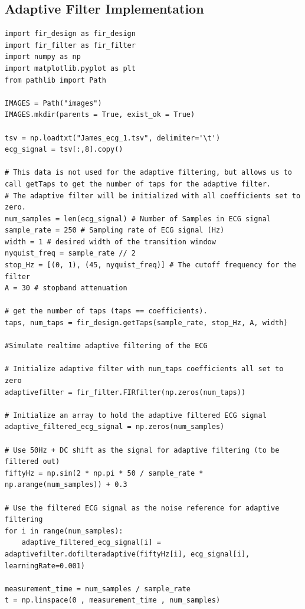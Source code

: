 \documentclass[8pt]{extarticle}
\begin{document}
\subsection{Adaptive Filter Implementation}
\begin{verbatim}
import fir_design as fir_design
import fir_filter as fir_filter
import numpy as np
import matplotlib.pyplot as plt
from pathlib import Path

IMAGES = Path("images")
IMAGES.mkdir(parents = True, exist_ok = True)

tsv = np.loadtxt("James_ecg_1.tsv", delimiter='\t')
ecg_signal = tsv[:,8].copy()

# This data is not used for the adaptive filtering, but allows us to call getTaps to get the number of taps for the adaptive filter. 
# The adaptive filter will be initialized with all coefficients set to zero.
num_samples = len(ecg_signal) # Number of Samples in ECG signal
sample_rate = 250 # Sampling rate of ECG signal (Hz)
width = 1 # desired width of the transition window
nyquist_freq = sample_rate // 2
stop_Hz = [(0, 1), (45, nyquist_freq)] # The cutoff frequency for the filter
A = 30 # stopband attenuation

# get the number of taps (taps == coefficients). 
taps, num_taps = fir_design.getTaps(sample_rate, stop_Hz, A, width)

#Simulate realtime adaptive filtering of the ECG

# Initialize adaptive filter with num_taps coefficients all set to zero
adaptivefilter = fir_filter.FIRfilter(np.zeros(num_taps)) 

# Initialize an array to hold the adaptive filtered ECG signal
adaptive_filtered_ecg_signal = np.zeros(num_samples)

# Use 50Hz + DC shift as the signal for adaptive filtering (to be filtered out)
fiftyHz = np.sin(2 * np.pi * 50 / sample_rate * np.arange(num_samples)) + 0.3

# Use the filtered ECG signal as the noise reference for adaptive filtering
for i in range(num_samples):
    adaptive_filtered_ecg_signal[i] = adaptivefilter.dofilteradaptive(fiftyHz[i], ecg_signal[i], learningRate=0.001) 

measurement_time = num_samples / sample_rate
t = np.linspace(0 , measurement_time , num_samples)  
\end{verbatim}
\end{document}
